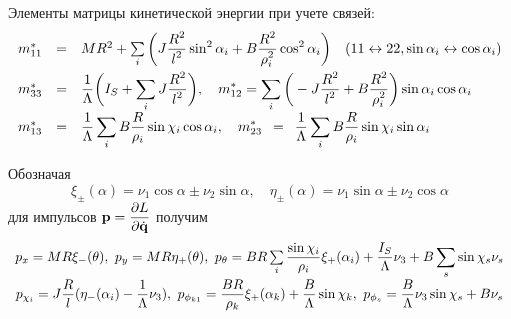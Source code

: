 Элементы матрицы кинетической энергии при учете связей:
\begin{equation}\label{mstar}
    \begin{array}{rcl}
        m^*_{11} & = & MR^2 + \sum\limits_i \bigg( J\ddfrac{R^2}{l^2}\sin^2\alpha_i + B\ddfrac{R^2}{\rho_i^2}\cos^2\alpha_i\bigg)\quad(11 \leftrightarrow 22, \sin\alpha_i \leftrightarrow \cos\alpha_i)\vsp
        m^*_{33} & = & \ddfrac{1}{\Lambda}\bigg(I_S + \sum\limits_i J\ddfrac{R^2}{l^2}\bigg),\quad
        m^*_{12}  =  \sum\limits_i \bigg(-J\ddfrac{R^2}{l^2} + B\ddfrac{R^2}{\rho_i^2}\bigg)\sin\alpha_i\cos\alpha_i\vsp
        m^*_{13} & = & \ddfrac{1}{\Lambda}\sum\limits_i B\ddfrac{R}{\rho_i}\sin\chi_i\cos\alpha_i,
        \quad
        m^*_{23} \enspace = \enspace \ddfrac{1}{\Lambda}\sum\limits_i B\ddfrac{R}{\rho_i}\sin\chi_i\sin\alpha_i
    \end{array}
\end{equation}

Обозначая
$$\xi_\pm(\alpha) = \nu_1\cos\alpha \pm \nu_2\sin\alpha, \quad \eta_\pm(\alpha) = \nu_1\sin\alpha \pm \nu_2\cos\alpha$$
для импульсов $\boldsymbol{\mathbf{p}} = \displaystyle\frac{\displaystyle \partial L}{\displaystyle \partial \dot{\boldsymbol{\mathbf{q}}}}$ получим
\begin{equation}\label{p}
    \begin{array}{c}
        p_x  =  MR\xi_-(\theta), \ p_y = MR\eta_+(\theta),\ 
        p_\theta  =  BR\sum\limits_i\ddfrac{\sin\chi_i}{\rho_i}\xi_+(\alpha_i) + \ddfrac{I_S}{\Lambda}\nu_3 + B\sum\limits_s\sin\chi_s\nu_s\vsp
        p_{\chi_i}  =  J\ddfrac{R}{l}(\eta_-(\alpha_i) - \ddfrac{1}{\Lambda}\nu_3), \ p_{\phi_{k1}}  =  \ddfrac{BR}{\rho_k}\xi_+(\alpha_k)+\ddfrac{B}{\Lambda}\sin\chi_k,\ %
        p_{\phi_s}  =  \ddfrac{B}{\Lambda}\nu_3\sin\chi_s + B\nu_s
    \end{array}
\end{equation}


